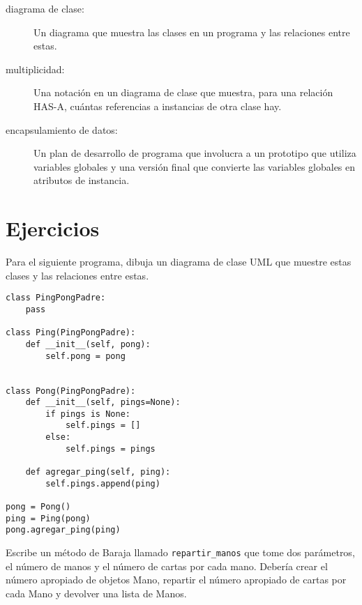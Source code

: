 \documentclass[10pt]{book}
\begin{document}
\begin{description}
\item[diagrama de clase:] Un diagrama que muestra las clases en un programa
y las relaciones entre estas.

\item[multiplicidad:] Una notación en un diagrama de clase que muestra, para
una relación HAS-A, cuántas referencias a instancias
de otra clase hay.

\item[encapsulamiento de datos:]  Un plan de desarrollo de programa que
involucra a un prototipo que utiliza variables globales y una versión final
que convierte las variables globales en atributos de instancia.

\end{description}


\section{Ejercicios}

\begin{exercise}
Para el siguiente programa, dibuja un diagrama de clase UML que muestre
estas clases y las relaciones entre estas.

\begin{verbatim}
class PingPongPadre:
    pass

class Ping(PingPongPadre):
    def __init__(self, pong):
        self.pong = pong


class Pong(PingPongPadre):
    def __init__(self, pings=None):
        if pings is None:
            self.pings = []
        else:
            self.pings = pings

    def agregar_ping(self, ping):
        self.pings.append(ping)

pong = Pong()
ping = Ping(pong)
pong.agregar_ping(ping)
\end{verbatim}


\end{exercise}



\begin{exercise}
Escribe un método de Baraja llamado \verb"repartir_manos" que
tome dos parámetros, el número de manos y el número de cartas por
cada mano.  Debería crear el número apropiado de objetos Mano, repartir
el número apropiado de cartas por cada Mano y devolver una lista de Manos.
\end{exercise}
\end{document}
